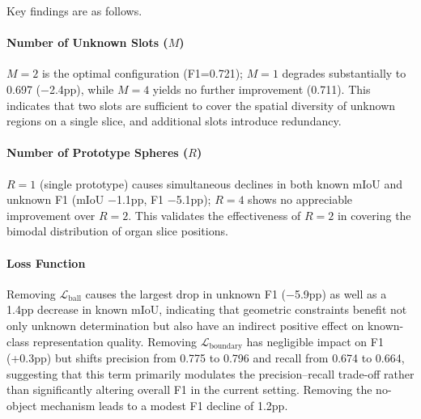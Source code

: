 \documentclass[3p,twocolumn,authoryear]{elsarticle}
\begin{document}
\begin{table}[t]
\centering
\footnotesize
\setlength{\tabcolsep}{4pt}
\caption{Structural ablation on Synapse A1. Baseline is the default configuration
($M=2, R=2$, full loss, no-object mechanism enabled). Each row modifies one variable.}\label{tab:ablation}
\end{table}

Key findings are as follows.

\paragraph{Number of Unknown Slots ($M$)}
$M=2$ is the optimal configuration (F1=0.721); $M=1$ degrades substantially to 0.697
($-$2.4pp), while $M=4$ yields no further improvement (0.711).
This indicates that two slots are sufficient to cover the spatial diversity of unknown
regions on a single slice, and additional slots introduce redundancy.

\paragraph{Number of Prototype Spheres ($R$)}
$R=1$ (single prototype) causes simultaneous declines in both known mIoU and unknown F1
(mIoU $-$1.1pp, F1 $-$5.1pp); $R=4$ shows no appreciable improvement over $R=2$.
This validates the effectiveness of $R=2$ in covering the bimodal distribution of organ
slice positions.

\paragraph{Loss Function}
Removing $\mathcal{L}_{\text{ball}}$ causes the largest drop in unknown F1 ($-$5.9pp)
as well as a 1.4pp decrease in known mIoU, indicating that geometric constraints
benefit not only unknown determination but also have an indirect positive effect on
known-class representation quality.
Removing $\mathcal{L}_{\text{boundary}}$ has negligible impact on F1 (+0.3pp) but
shifts precision from 0.775 to 0.796 and recall from 0.674 to 0.664, suggesting
that this term primarily modulates the precision--recall trade-off rather than
significantly altering overall F1 in the current setting.
Removing the no-object mechanism leads to a modest F1 decline of 1.2pp.
\end{document}
